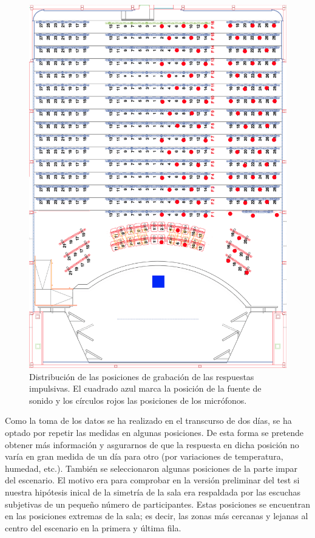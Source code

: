 \documentclass[11pt,a4paper,twoside]{book}
\begin{document}
		    \begin{figure}
	            \includegraphics[scale=0.1]{../imagenes/auditorio_butacas_marcadas}
			    \centering
			    \caption{Distribución de las posiciones de grabación de las respuestas impulsivas. El cuadrado azul marca la posición de la fuente de sonido y los círculos rojos las posiciones de los micrófonos.}
			    \label{fig:butacasMarcadas}
	        \end{figure}

		    Como la toma de los datos se ha realizado en el transcurso de dos días, se ha optado por repetir las medidas en algunas posiciones. De esta forma se pretende obtener más información y asgurarnos de que la respuesta en dicha posición no varía en gran medida de un día para otro (por variaciones de temperatura, humedad, etc.). También se seleccionaron algunas posiciones de la parte impar del escenario. El motivo era para comprobar en la versión preliminar del test si nuestra hipótesis inical de la simetría de la sala era respaldada por las escuchas subjetivas de un pequeño número de participantes. Estas posiciones se encuentran en las posiciones extremas de la sala; es decir, las zonas más cercanas y lejanas al centro del escenario en la primera y última fila.
\end{document}
